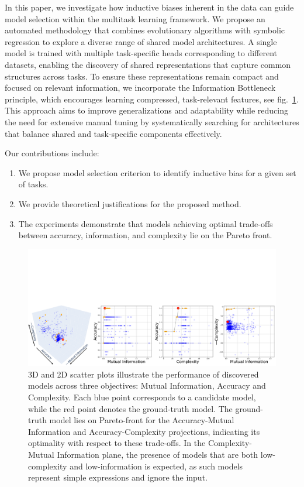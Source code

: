\documentclass[14pt]{extarticle}
\begin{document}
In this paper, we investigate how inductive biases inherent in the data can guide model selection within the multitask learning framework. We propose an automated methodology that combines evolutionary algorithms with symbolic regression to explore a diverse range of shared model architectures. A single model is trained with multiple task-specific heads corresponding to different datasets, enabling the discovery of shared representations that capture common structures across tasks. To ensure these representations remain compact and focused on relevant information, we incorporate the Information Bottleneck principle, which encourages learning compressed, task-relevant features, see fig.~\ref{3d-paretto-front}. This approach aims to improve generalizations and adaptability while reducing the need for extensive manual tuning by systematically searching for architectures that balance shared and task-specific components effectively. 

Our contributions include:
\begin{enumerate}
    \item We propose model selection criterion to identify inductive bias for a given set of tasks.
    \item We provide theoretical justifications for the proposed method.
    \item The experiments demonstrate that models achieving optimal trade-offs between accuracy, information, and complexity lie on the Pareto front.
\end{enumerate}

\begin{figure}[hbt!]
    \centering
    \includegraphics[width=1\textwidth]{3d_paretto.drawio.pdf}
    \caption{3D and 2D scatter plots illustrate the performance of discovered models across three objectives: Mutual Information, Accuracy and Complexity. Each blue point corresponds to a candidate model, while the red point denotes the ground-truth model. The ground-truth model lies on Pareto-front for the Accuracy-Mutual Information and Accuracy-Complexity projections, indicating its optimality with respect to these trade-offs. In the Complexity-Mutual Information plane, the presence of models that are both low-complexity and low-information is expected, as such models represent simple expressions and ignore the input.}
    \label{3d-paretto-front}
\end{figure}
\newpage
\end{document}
